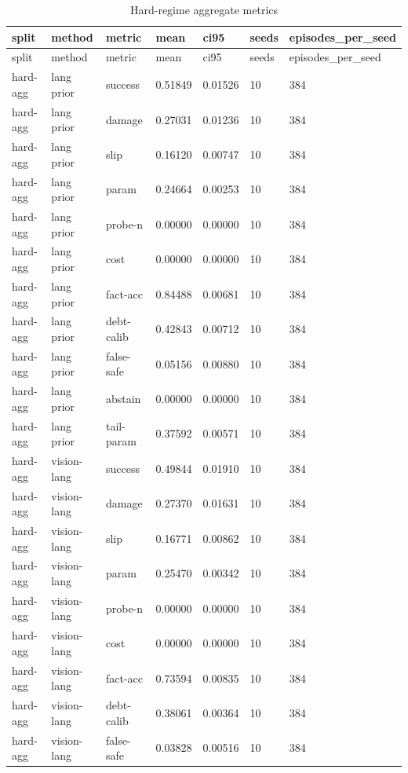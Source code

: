 \documentclass{article}
\begin{document}
\begin{center}
\tiny
\renewcommand{\arraystretch}{0.92}
\setlength{\tabcolsep}{3pt}
\begin{longtable}{lllllll}
\caption{Hard-regime aggregate metrics}\label{tab:hard-full}\\
\toprule
split & method & metric & mean & ci95 & seeds & episodes\_per\_seed \\
\midrule
\endfirsthead
\toprule
split & method & metric & mean & ci95 & seeds & episodes\_per\_seed \\
\midrule
\endhead
hard-agg & lang prior & success & 0.51849 & 0.01526 & 10 & 384 \\
hard-agg & lang prior & damage & 0.27031 & 0.01236 & 10 & 384 \\
hard-agg & lang prior & slip & 0.16120 & 0.00747 & 10 & 384 \\
hard-agg & lang prior & param & 0.24664 & 0.00253 & 10 & 384 \\
hard-agg & lang prior & probe-n & 0.00000 & 0.00000 & 10 & 384 \\
hard-agg & lang prior & cost & 0.00000 & 0.00000 & 10 & 384 \\
hard-agg & lang prior & fact-acc & 0.84488 & 0.00681 & 10 & 384 \\
hard-agg & lang prior & debt-calib & 0.42843 & 0.00712 & 10 & 384 \\
hard-agg & lang prior & false-safe & 0.05156 & 0.00880 & 10 & 384 \\
hard-agg & lang prior & abstain & 0.00000 & 0.00000 & 10 & 384 \\
hard-agg & lang prior & tail-param & 0.37592 & 0.00571 & 10 & 384 \\
hard-agg & vision-lang & success & 0.49844 & 0.01910 & 10 & 384 \\
hard-agg & vision-lang & damage & 0.27370 & 0.01631 & 10 & 384 \\
hard-agg & vision-lang & slip & 0.16771 & 0.00862 & 10 & 384 \\
hard-agg & vision-lang & param & 0.25470 & 0.00342 & 10 & 384 \\
hard-agg & vision-lang & probe-n & 0.00000 & 0.00000 & 10 & 384 \\
hard-agg & vision-lang & cost & 0.00000 & 0.00000 & 10 & 384 \\
hard-agg & vision-lang & fact-acc & 0.73594 & 0.00835 & 10 & 384 \\
hard-agg & vision-lang & debt-calib & 0.38061 & 0.00364 & 10 & 384 \\
hard-agg & vision-lang & false-safe & 0.03828 & 0.00516 & 10 & 384 \\

\end{longtable}
\end{center}
\end{document}
